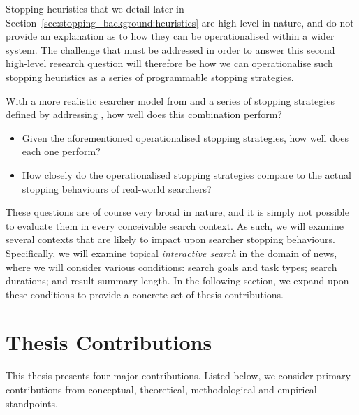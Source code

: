 Stopping heuristics that we detail later in Section~\ref{sec:stopping_background:heuristics} are high-level in nature, and do not provide an explanation as to how they can be operationalised within a wider system. The challenge that must be addressed in order to answer this second high-level research question will therefore be how we can operationalise such stopping heuristics as a series of programmable stopping strategies.

With a more realistic searcher model from  and a series of stopping strategies defined by addressing , how well does this combination perform?

\begin{itemize}
    \item[]{ Given the aforementioned operationalised stopping strategies, how well does each one perform?}
    \item[]{ How closely do the operationalised stopping strategies compare to the actual stopping behaviours of real-world searchers?}
\end{itemize}

These questions are of course very broad in nature, and it is simply not possible to evaluate them in every conceivable search context. As such, we will examine several contexts that are likely to impact upon searcher stopping behaviours. Specifically, we will examine topical \emph{interactive search} in the domain of news, where we will consider various conditions: search goals and task types; search durations; and result summary length. In the following section, we expand upon these conditions to provide a concrete set of thesis contributions.

\section{Thesis Contributions}\label{sec:intro:contribs}
This thesis presents four major contributions. Listed below, we consider primary contributions from conceptual, theoretical, methodological and empirical standpoints.

